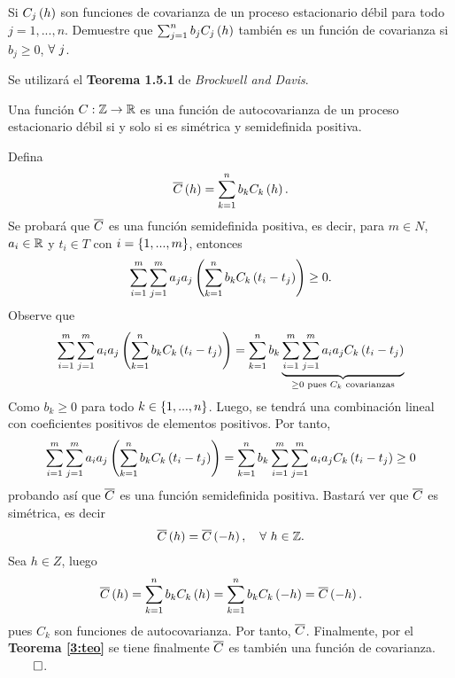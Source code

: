 \documentclass[../main.tex]{subfiles}
\begin{document}
    \begin{enunciado}
    	Si $C_j\left( h \right)$ son funciones de covarianza de un proceso estacionario débil para todo $j = 1,...,n$. Demuestre que $\sum_{j = 1}^{n} b_j C_j\left( h \right)$ también es un función de covarianza si $b_j \geq 0$, $\forall\  j$.
    \end{enunciado}
    
    \begin{demostracion}
        Se utilizará el \textbf{Teorema 1.5.1} de \textit{Brockwell and Davis}.
            \begin{teorema}
                \label{3:teo}
                Una función $C: \mathbb{Z} \rightarrow \mathbb{R}$ es una función de autocovarianza de un proceso estacionario débil si y solo si es simétrica y semidefinida positiva.
            \end{teorema}
        Defina
            \begin{align*}
                \overline{ C }\left( h \right) = \sum_{k = 1}^{n} b_k C_k\left( h \right). 
            \end{align*}
        Se probará que $\overline{ C }$ es una función semidefinida positiva, es decir, para $m \in N$, $a_i \in \mathbb{R}$ y $t_i \in T$ con $i = \left\lbrace 1,...,m \right\rbrace$, entonces
            \begin{align*}
            	\sum_{i = 1}^{m} \sum_{j = 1}^{m} a_j a_j \left( \sum_{k = 1}^{n} b_k C_k\left( t_i - t_j \right) \right) \geq 0.
            \end{align*}
        Observe que
            \begin{align*}
            	\sum_{i = 1}^{m} \sum_{j = 1}^{m} a_i a_j \left( \sum_{k = 1}^{n} b_k C_k\left( t_i - t_j \right) \right) = \sum_{k = 1}^{n} b_k \underbrace{\sum_{i = 1}^{m} \sum_{j = 1}^{m} a_i a_j C_k\left( t_i-t_j \right)}_{\geq 0 \text{ pues $C_k$ covarianzas}}
            \end{align*}
        Como $b_k \geq 0$ para todo $k \in \left\lbrace 1,...,n \right\rbrace$. Luego, se tendrá una combinación lineal con coeficientes positivos de elementos positivos. Por tanto,
            \begin{align*}
            	\sum_{i = 1}^{m} \sum_{j = 1}^{m} a_i a_j \left( \sum_{k = 1}^{n} b_k C_k\left( t_i - t_j \right) \right) = \sum_{k = 1}^{n} b_k \sum_{i = 1}^{m} \sum_{j = 1}^{m} a_i a_j C_k\left( t_i-t_j \right) \geq 0
            \end{align*}
        probando así que $\overline{ C }$ es una función semidefinida positiva. Bastará ver que $\overline{ C }$ es simétrica, es decir
            \begin{align*}
            	\overline{ C }\left( h \right) = \overline{ C }\left( -h \right),\quad \forall\  h \in \mathbb{Z}.
            \end{align*}
        Sea $h \in Z$, luego
            \begin{align*}
            	\overline{ C }\left( h \right) = \sum_{k = 1}^{n} b_k C_k\left( h \right) = \sum_{k = 1}^{n} b_k C_k\left( -h \right) = \overline{ C }\left( -h \right).
            \end{align*}
        pues $C_k$ son funciones de autocovarianza. Por tanto, $\overline{ C }$. Finalmente, por el \textbf{Teorema \ref{3:teo}} se tiene finalmente $\overline{ C }$ es también una función de covarianza. $\qed$.
    \end{demostracion}
\end{document}
